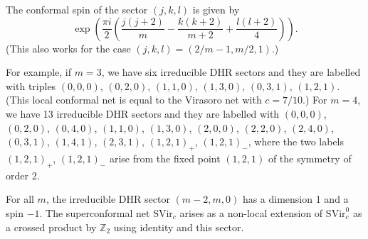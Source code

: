 \documentclass[11pt]{article}
\def\SVir{{\mathrm {SVir}}}
\def\Z{{\mathbb Z}}
\begin{document}
The conformal spin of the sector $(j,k,l)$ is given by
$$\exp\left(\frac{\pi i}{2}\left(\frac{j(j+2)}{m}-
\frac{k(k+2)}{m+2}+\frac{l(l+2)}{4}\right)\right).$$
(This also works for the case $(j,k,l)=(2/m-1, m/2,1)$.) 

For example, if $m=3$, we have six
irreducible DHR sectors and they are labelled with triples
$(0,0,0)$, $(0,2,0)$, $(1,1,0)$, $(1,3,0)$, $(0,3,1)$, $(1,2,1)$.
(This local conformal net is equal to the Virasoro net with
$c=7/10$.)
For $m=4$, we have 13 irreducible DHR sectors and they are
labelled with
$(0,0,0)$, $(0,2,0)$, $(0,4,0)$, $(1,1,0)$, $(1,3,0)$,
$(2,0,0)$, $(2,2,0)$, $(2,4,0)$, $(0,3,1)$, $(1,4,1)$,
$(2,3,1)$, $(1,2,1)_+$, $(1,2,1)_-$, where
the two labels $(1,2,1)_+$, $(1,2,1)_-$ arise from the fixed
point $(1,2,1)$ of the symmetry of order 2.

For all $m$, the irreducible DHR sector $(m-2,m,0)$ has a
dimension 1 and a spin $-1$.  The superconformal net
$\SVir_c$ arises as a non-local extension of $\SVir^0_c$
as a crossed product by $\Z_2$ using identity and this sector.
\end{document}
